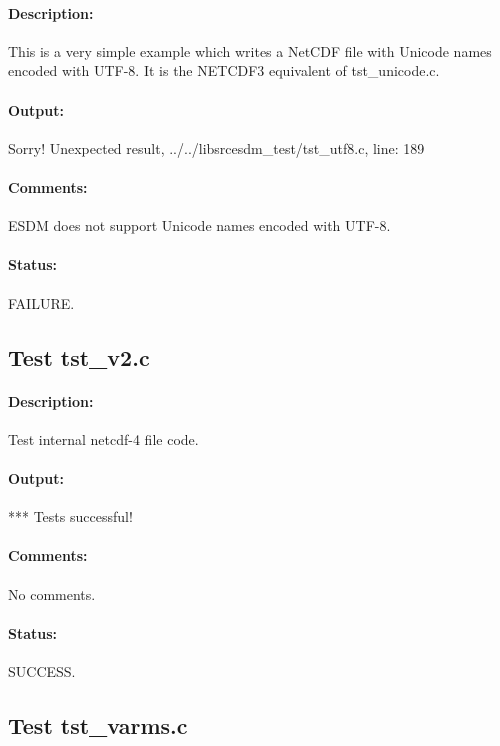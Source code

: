 \paragraph{Description:} This is a very simple example which writes a NetCDF file with Unicode names encoded with UTF-8. It is the NETCDF3 equivalent of tst\_unicode.c.

\paragraph{Output:} Sorry! Unexpected result, ../../libsrcesdm\_test/tst\_utf8.c, line: 189

\paragraph{Comments:} ESDM does not support Unicode names encoded with UTF-8.

\paragraph{Status:} FAILURE.

\subsection{Test tst\_v2.c}

\paragraph{Description:} Test internal netcdf-4 file code.

\paragraph{Output:} *** Tests successful!

\paragraph{Comments:} No comments.

\paragraph{Status:} SUCCESS.

\subsection{Test tst\_varms.c}

